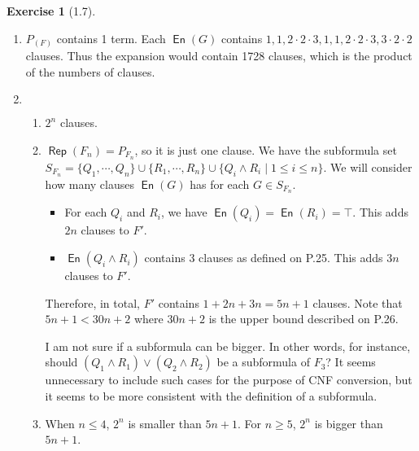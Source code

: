 \documentclass[12pt, psamsfonts]{amsart}
\theoremstyle{definition}
\newtheorem*{exer}{Exercise}
\theoremstyle{remark}
\DeclareMathOperator{\En}{\textsf{En}}
\DeclareMathOperator{\Rep}{\textsf{Rep}}
\numberwithin{equation}{subsection}
\begin{document}
\begin{exer}[1.7]
    $ $
    \begin{enumerate}[label=(\alph*)]
        \item
            $P_{(F)}$ contains 1 term.
            Each $\En(G)$ contains $1, 1, 2 \cdot 2 \cdot 3, 1, 1, 2 \cdot 2 \cdot 3, 3 \cdot 2 \cdot 2$ clauses.
            Thus the expansion would contain 1728 clauses, which is the product of the numbers of clauses.
        \item
            $ $
            \begin{enumerate}[label=(\roman*)]
                \item
                    $2^n$ clauses.
                \item
                    $\Rep(F_n) = P_{F_n}$, so it is just one clause.
                    We have the subformula set $S_{F_n} = \{ Q_1, \cdots, Q_n \} \cup \{ R_1, \cdots, R_n \} \cup \{ Q_i \land R_i \mid 1 \leq i \leq n \}$.
                    We will consider how many clauses $\En(G)$ has for each $G \in S_{F_n}$.
                    \begin{itemize}
                        \item
                            For each $Q_i$ and $R_i$, we have $\En(Q_i) = \En(R_i) = \top$.
                            This adds $2n$ clauses to $F'$.
                        \item
                            $\En(Q_i \land R_i)$ contains 3 clauses as defined on P.25.
                            This adds $3n$ clauses to $F'$.
                    \end{itemize}
                    Therefore, in total, $F'$ contains $1 + 2n + 3n = 5n + 1$ clauses.
                    Note that $5n + 1 < 30n + 2$ where $30n + 2$ is the upper bound described on P.26.

                    I am not sure if a subformula can be bigger.
                    In other words, for instance, should $(Q_1 \land R_1) \lor (Q_2 \land R_2)$ be a subformula of $F_3$?
                    It seems unnecessary to include such cases for the purpose of CNF conversion, but it seems to be more consistent with the definition of a subformula.
                \item
                    When $n \leq 4$, $2^n$ is smaller than $5n + 1$.
                    For $n \geq 5$, $2^n$ is bigger than $5n + 1$.
            \end{enumerate}
    \end{enumerate}
\end{exer}
\end{document}

